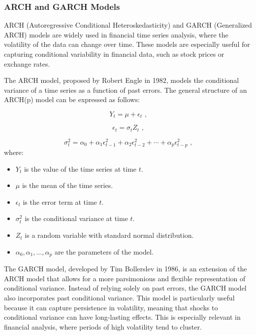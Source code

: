 \subsubsection{ARCH and GARCH Models}

ARCH (Autoregressive Conditional Heteroskedasticity) and GARCH (Generalized ARCH) models are widely used in financial time series analysis, where the volatility of the data can change over time. These models are especially useful for capturing conditional variability in financial data, such as stock prices or exchange rates.
\vspace{10pt}

The ARCH model, proposed by Robert Engle in 1982, models the conditional variance of a time series as a function of past errors. The general structure of an ARCH(p) model can be expressed as follows:

\begin{equation}
Y_t = \mu + \epsilon_t \text{ ,}
\end{equation}

\begin{equation}
\epsilon_t = \sigma_t Z_t \text{ ,}
\end{equation}

\begin{equation}
\sigma_t^2 = \alpha_0 + \alpha_1 \epsilon_{t-1}^2 + \alpha_2 \epsilon_{t-2}^2 + \cdots + \alpha_p \epsilon_{t-p}^2 \text{ ,}
\end{equation}where:
\begin{itemize}
    \item \( Y_t \) is the value of the time series at time \( t \).
    \item \( \mu \) is the mean of the time series.
    \item \( \epsilon_t \) is the error term at time \( t \).
    \item \( \sigma_t^2 \) is the conditional variance at time \( t \).
    \item \( Z_t \) is a random variable with standard normal distribution.
    \item \( \alpha_0, \alpha_1, \ldots, \alpha_p \) are the parameters of the model.
\end{itemize}

The GARCH model, developed by Tim Bollerslev in 1986, is an extension of the ARCH model that allows for a more parsimonious and flexible representation of conditional variance. Instead of relying solely on past errors, the GARCH model also incorporates past conditional variance. This model is particularly useful because it can capture persistence in volatility, meaning that shocks to conditional variance can have long-lasting effects. This is especially relevant in financial analysis, where periods of high volatility tend to cluster.

